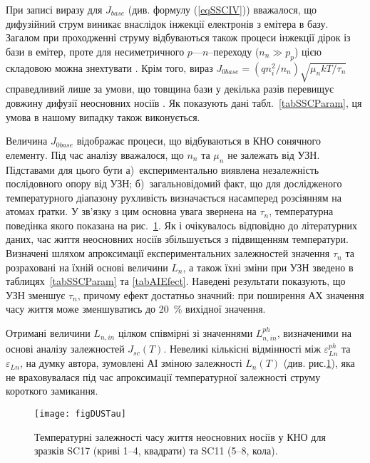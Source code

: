 При записі виразу для $J_{base}$ (див. формулу (\ref{eqSSCIV})) вважалося, що дифузійний струм виникає внаслідок інжекції
електронів з емітера в базу.
Загалом при проходженні струму відбуваються також процеси інжекції дірок із бази в емітер, проте для несиметричного $p$---$n$--переходу
($n_n\gg p_p$) цією складовою можна знехтувати \cite{Breitenstein2013}.
Крім того, вираз $J_{0base}=(qn_i^2/n_n)\sqrt{\mu_nkT/\tau_n}$ справедливий лише за умови, що товщина бази у декілька разів перевищує
довжину дифузії неосновних носіїв \cite{Sze2012}.
Як показують дані табл.~\ref{tabSSCParam}, ця умова в нашому випадку також виконується.

Величина $J_{0base}$ відображає процеси, що відбуваються в КНО сонячного елементу.
Під час аналізу  вважалося, що $n_n$ та $\mu_n$ не залежать від УЗН.
Підставами для цього бути
а)~експериментально виявлена незалежність послідовного опору від УЗН;
б)~загальновідомий факт, що для дослідженого температурного діапазону рухливість визначається насамперед розсіянням на атомах ґратки.
У зв'язку з цим основна увага звернена на $\tau_n$, температурна поведінка якого показана на рис.~\ref{figDUSTau}.
Як і очікувалось відповідно до літературних даних, час життя неосновних носіїв збільшується з підвищенням температури.
Визначені шляхом апроксимації експериментальних залежностей значення $\tau_n$ та розраховані на їхній основі величини $L_n$,
а також їхні зміни при УЗН зведено в таблицях~\ref{tabSSCParam} та \ref{tabAIEfect}.
Наведені результати показують, що УЗН зменшує $\tau_n$, причому ефект достатньо значний:
при поширення АХ значення часу життя може зменшуватись до 20~\% вихідної значення.

Отримані величини $L_{n,in}$ цілком співмірні зі значеннями $L_{n,in}^{ph}$, визначеними на основі аналізу залежностей $J_{sc}(T)$.
Невеликі кількісні відмінності між $\varepsilon_{L n}^{ph}$ та $\varepsilon_{L n}$,
на думку автора, зумовлені АІ зміною залежності $L_n(T)$ (див. рис.\ref{figDUSTau}),
яка не враховувалася під час апроксимації температурної залежності струму короткого замикання.


\begin{figure}
\center
\texttt{[image: figDUSTau]}%
\caption{\label{figDUSTau}
Температурні залежності часу життя неосновних носіїв у КНО
для зразків SC17 (криві 1--4, квадрати) та SC11 (5--8, кола).
\FigCaptionSSC
}%
\end{figure}


